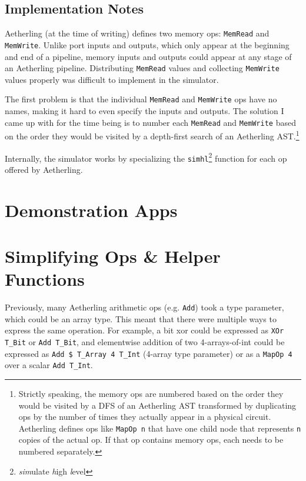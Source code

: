 \documentclass[12pt]{article}
\begin{document}
\subsection{Implementation Notes}

Aetherling (at the time of writing) defines two memory ops:
\texttt{MemRead} and \texttt{MemWrite}. Unlike port inputs and
outputs, which only appear at the beginning and end of a pipeline,
memory inputs and outputs could appear at any stage of an Aetherling
pipeline. Distributing \texttt{MemRead} values and collecting
\texttt{MemWrite} values properly was difficult to implement in the
simulator.

The first problem is that the individual \texttt{MemRead} and
\texttt{MemWrite} ops have no names, making it hard to even specify
the inputs and outputs. The solution I came up with for the time being
is to number each \texttt{MemRead} and \texttt{MemWrite} based on the
order they would be visited by a depth-first search of an Aetherling
AST.\footnote{Strictly speaking, the memory ops are numbered based on
  the order they would be visited by a DFS of an Aetherling AST
  transformed by duplicating ops by the number of times they actually
  appear in a physical circuit. Aetherling defines ops like
  \texttt{MapOp n} that have one child node that represents \texttt{n}
  copies of the actual op. If that op contains memory ops, each needs
  to be numbered separately.}

Internally, the simulator works by specializing the \texttt{simhl}\footnote{
\textit{sim}ulate \textit{h}igh \textit{l}evel} function for each op
offered by Aetherling.

\section{Demonstration Apps}


\section{Simplifying Ops \& Helper Functions}

Previously, many Aetherling arithmetic ops (e.g. \texttt{Add}) took a
type parameter, which could be an array type. This meant that there
were multiple ways to express the same operation. For example, a bit
xor could be expressed as \texttt{XOr T\_Bit} or \texttt{Add T\_Bit},
and elementwise addition of two 4-arrays-of-int could be expressed as
\texttt{Add \$ T\_Array 4 T\_Int} (4-array type parameter) or as a
\texttt{MapOp 4} over a scalar \texttt{Add T\_Int}.
\end{document}
